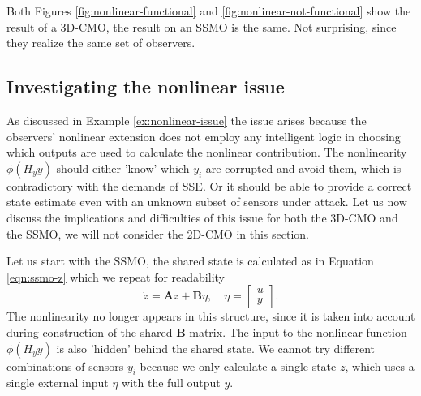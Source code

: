Both Figures \ref{fig:nonlinear-functional} and \ref{fig:nonlinear-not-functional} show the result of a 3D-CMO, the result on an SSMO is the same. Not surprising, since they realize the same set of observers.

\subsection{Investigating the nonlinear issue}\label{subsec:investigating-nonlinear-issue}
As discussed in Example \ref{ex:nonlinear-issue} the issue arises because the observers' nonlinear extension does not employ any intelligent logic in choosing which outputs are used to calculate the nonlinear contribution. The nonlinearity $\phi(H_yy)$ should either 'know' which $y_i$ are corrupted and avoid them, which is contradictory with the demands of SSE. Or it should be able to provide a correct state estimate even with an unknown subset of sensors under attack. Let us now discuss the implications and difficulties of this issue for both the 3D-CMO and the SSMO, we will not consider the 2D-CMO in this section. 

Let us start with the SSMO, the shared state is calculated as in Equation \eqref{eqn:ssmo-z} which we repeat for readability
\begin{equation*}
    \dot{z} = \mathbf{A}z + \mathbf{B}\eta, \quad \eta = 
    \begin{bmatrix}
        u \\ y
    \end{bmatrix}.
\end{equation*}
The nonlinearity no longer appears in this structure, since it is taken into account during construction of the shared $\mathbf{B}$ matrix. The input to the nonlinear function $\phi(H_yy)$ is also 'hidden' behind the shared state. We cannot try different combinations of sensors $y_i$ because we only calculate a single state $z$, which uses a single external input $\eta$ with the full output $y$.

